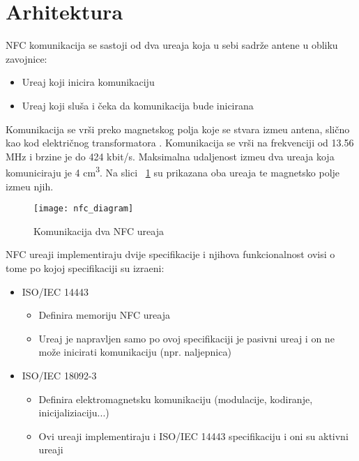 \section{Arhitektura}

NFC komunikacija se sastoji od dva ure\dj aja koja u sebi sadr\v{z}e antene u obliku zavojnice:
\begin{itemize}
	\item Ure\dj aj koji inicira komunikaciju
	\item Ure\dj aj koji slu\v{s}a i \v{c}eka da komunikacija bude inicirana
\end{itemize}

Komunikacija se vr\v{s}i preko magnetskog polja koje se stvara izme\dj u antena, sli\v{c}no kao kod elektri\v{c}nog transformatora \cite{nfc_techonology}. Komunikacija se vr\v{s}i na frekvenciji od 13.56 MHz i brzine je do 424 kbit/s. Maksimalna udaljenost izme\dj u dva ure\dj aja koja komuniciraju je 4 cm\textsuperscript{3}. Na slici ~\ref{fig:nfc_arhitektura} su prikazana oba ure\dj aja te magnetsko polje izme\dj u njih.


\begin{figure}[!htbp]
	\begin{center}
 \texttt{[image: nfc\_diagram]}
 \caption{Komunikacija dva NFC ure\dj aja \cite{nfc_techonology}}
 \label{fig:nfc_arhitektura}
	\end{center}
\end{figure}

NFC ure\dj aji implementiraju dvije specifikacije i njihova funkcionalnost ovisi o tome po kojoj specifikaciji su izra\dj eni:

\begin{itemize}
	\item ISO/IEC 14443
	\begin{itemize}
		\item Definira memoriju NFC ure\dj aja
		\item Ure\dj aj je napravljen samo po ovoj specifikaciji je pasivni ure\dj aj i on ne mo\v{z}e inicirati komunikaciju (npr. naljepnica)
		
	\end{itemize}
	\item ISO/IEC 18092-3
	
	\begin{itemize}
		\item Definira elektromagnetsku komunikaciju (modulacije, kodiranje, inicijaliziaciju...)
		\item Ovi ure\dj aji implementiraju i ISO/IEC 14443 specifikaciju i oni su aktivni ure\dj aji
	\end{itemize}
\end{itemize}

